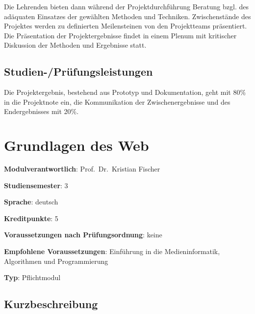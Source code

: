 Die Lehrenden bieten dann während der Projektdurchführung Beratung bzgl.
des adäquaten Einsatzes der gewählten Methoden und Techniken.
Zwischenstände des Projektes werden zu definierten Meilensteinen von den
Projektteams präsentiert. Die Präsentation der Projektergebnisse findet
in einem Plenum mit kritischer Diskussion der Methoden und Ergebnisse
statt.

\section*{Studien-/Prüfungsleistungen\label{/mi-2017/modulbeschreibungen-bachelor/BA_Entwicklungsprojekt}}\label{studien-pruxfcfungsleistungenpathlabelmi-2017modulbeschreibungen-bachelorbaux5fentwicklungsprojekt}

Die Projektergebnis, bestehend aus Prototyp und Dokumentation, geht mit
80\% in die Projektnote ein, die Kommunikation der Zwischenergebnisse
und des Endergebnisses mit 20\%.

\chapter{Grundlagen des
Web\label{/mi-2017/modulbeschreibungen-bachelor/BA_Grundlagen_des_Web}}\label{grundlagen-des-webpathlabelmi-2017modulbeschreibungen-bachelorbaux5fgrundlagenux5fdesux5fweb}

\begin{modulHead}
\textbf{Modulverantwortlich}: Prof.~Dr.~Kristian
Fischer
\end{modulHead}
\begin{modulHead}
\textbf{Studiensemester}:
3
\end{modulHead}
\begin{modulHead}
\textbf{Sprache}:
deutsch
\end{modulHead}
\begin{modulHead}
\textbf{Kreditpunkte}:
5
\end{modulHead}
\begin{modulHead}
\textbf{Voraussetzungen nach
Prüfungsordnung}:
keine
\end{modulHead}
\begin{modulHead}
\textbf{Empfohlene
Voraussetzungen}: Einführung in die Medieninformatik, Algorithmen und
Programmierung
\end{modulHead}
\begin{modulHead}
\textbf{Typ}:
Pflichtmodul
\end{modulHead}


\section*{Kurzbeschreibung\label{/mi-2017/modulbeschreibungen-bachelor/BA_Grundlagen_des_Web}}\label{kurzbeschreibungpathlabelmi-2017modulbeschreibungen-bachelorbaux5fgrundlagenux5fdesux5fweb}


